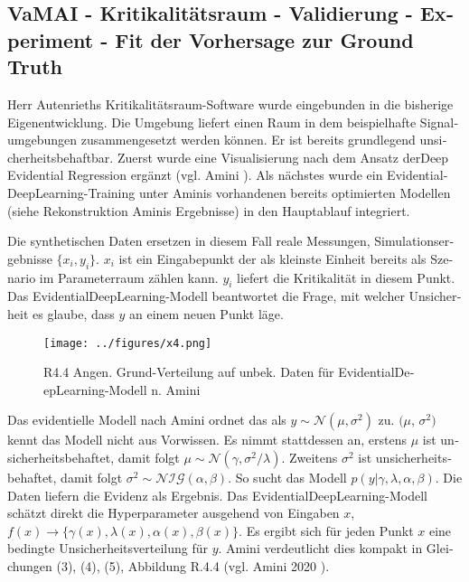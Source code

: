 \begin{otherlanguage}{ngerman}
\subsection*{VaMAI - Kritikalitätsraum - Validierung - Experiment - Fit der Vorhersage zur Ground Truth}

Herr Autenrieths Kritikalitätsraum-Software wurde eingebunden in die bisherige Eigenentwicklung. Die Umgebung liefert einen Raum in dem beispielhafte Signalumgebungen 
zusammengesetzt werden können. Er ist bereits grundlegend unsicherheitsbehaftbar. Zuerst wurde eine Visualisierung nach dem Ansatz der\glqq{}Deep Evidential Regression\grqq{} ergänzt (vgl. Amini \parencite{amini2020}). Als nächstes wurde ein \gls{EvidentialDeepLearning}-Training unter Aminis vorhandenen bereits optimierten Modellen (siehe Rekonstruktion Aminis Ergebnisse) in den Hauptablauf integriert. 

Die synthetischen Daten ersetzen in diesem Fall reale Messungen, Simulationsergebnisse $\{ x_{i}, y_{i} \}$. $x_{i}$ ist ein Eingabepunkt der als kleinste Einheit bereits als Szenario im Parameterraum zählen kann. $y_{i}$ liefert die Kritikalität in diesem Punkt. Das \gls{EvidentialDeepLearning}-Modell beantwortet die Frage, mit welcher Unsicherheit es glaube, dass $y$ an einem neuen Punkt läge. 

\begin{figure}[!ht]
  \centering
  \texttt{[image: ../figures/x4.png]}
  \caption{R4.4 Angen. Grund-Verteilung auf unbek. Daten für \gls{EvidentialDeepLearning}-Modell n. Amini}
\end{figure}

Das evidentielle Modell nach Amini ordnet das als $y \sim \mathcal{N}(\mu, \sigma^2)$ zu. $(\mu$, $\sigma^2)$ kennt das Modell nicht aus Vorwissen. Es nimmt stattdessen an, erstens $\mu$ ist unsicherheitsbehaftet, damit folgt $\mu \sim \mathcal{N}(\gamma, \sigma^{2} / \lambda)$. Zweitens $\sigma^{2}$ ist unsicherheitsbehaftet, damit folgt $\sigma^{2} \sim \mathcal{NIG}(\alpha, \beta)$. So sucht das Modell $p(y|\gamma,\lambda,\alpha,\beta)$. Die Daten liefern die Evidenz als Ergebnis. Das \gls{EvidentialDeepLearning}-Modell schätzt direkt die Hyperparameter ausgehend von Eingaben $x$, $f(x) \rightarrow \{ \gamma(x), \lambda(x), \alpha(x), \beta(x) \}$. Es ergibt sich für jeden Punkt $x$ eine bedingte Unsicherheitsverteilung für $y$. Amini verdeutlicht dies kompakt in Gleichungen (3), (4), (5), Abbildung R.4.4 (vgl. Amini 2020 \parencite{amini2020}). 


\end{otherlanguage}
